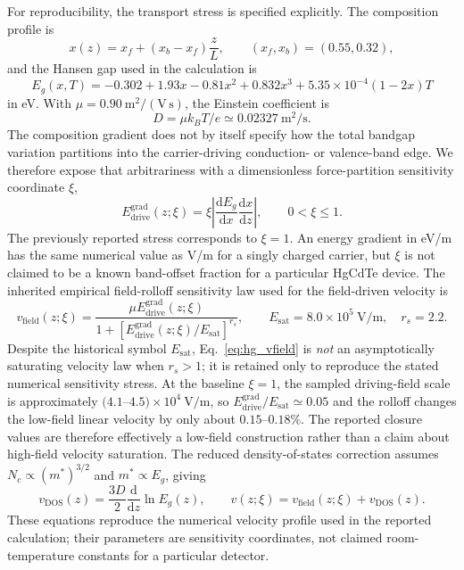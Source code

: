 \documentclass[11pt]{article}
\newcommand{\dd}{\mathrm{d}}
\begin{document}
For reproducibility, the transport stress is specified explicitly. The composition profile is
\begin{equation}
x(z)=x_f+(x_b-x_f)\frac{z}{L},\qquad (x_f,x_b)=(0.55,0.32),
\end{equation}
and the Hansen gap used in the calculation is
\begin{equation}
\boxed{E_g(x,T)=-0.302+1.93x-0.81x^2+0.832x^3+5.35\times10^{-4}(1-2x)T}
\label{eq:hansen_explicit}
\end{equation}
in eV. With $\mu=0.90~\mathrm{m^2/(V\,s)}$, the Einstein coefficient is
\begin{equation}
D=\mu k_BT/e\simeq0.02327~\mathrm{m^2/s}.
\end{equation}
The composition gradient does not by itself specify how the total bandgap variation partitions into the carrier-driving conduction- or valence-band edge.  We therefore expose that arbitrariness with a dimensionless force-partition sensitivity coordinate $\xi$,
\begin{equation}
\boxed{E_{\mathrm{drive}}^{\mathrm{grad}}(z;\xi)=\xi\left|\frac{\dd E_g}{\dd x}\frac{\dd x}{\dd z}\right|,\qquad 0<\xi\le1.}
\label{eq:hg_xi_field}
\end{equation}
The previously reported stress corresponds to $\xi=1$.  An energy gradient in eV/m has the same numerical value as V/m for a singly charged carrier, but $\xi$ is not claimed to be a known band-offset fraction for a particular HgCdTe device. The inherited empirical field-rolloff sensitivity law used for the field-driven velocity is
\begin{equation}
v_{\mathrm{field}}(z;\xi)=\frac{\mu E_{\mathrm{drive}}^{\mathrm{grad}}(z;\xi)}{1+[E_{\mathrm{drive}}^{\mathrm{grad}}(z;\xi)/E_{\mathrm{sat}}]^{r_s}},
\qquad E_{\mathrm{sat}}=8.0\times10^5~\mathrm{V/m},\quad r_s=2.2.
\label{eq:hg_vfield}
\end{equation}
Despite the historical symbol $E_{\mathrm{sat}}$, Eq.~\eqref{eq:hg_vfield} is \emph{not} an asymptotically saturating velocity law when $r_s>1$; it is retained only to reproduce the stated numerical sensitivity stress. At the baseline $\xi=1$, the sampled driving-field scale is approximately $(4.1$--$4.5)\times10^4~\mathrm{V/m}$, so $E_{\mathrm{drive}}^{\mathrm{grad}}/E_{\mathrm{sat}}\simeq0.05$ and the rolloff changes the low-field linear velocity by only about $0.15$--$0.18\%$. The reported closure values are therefore effectively a low-field construction rather than a claim about high-field velocity saturation. The reduced density-of-states correction assumes $N_c\propto(m^*)^{3/2}$ and $m^*\propto E_g$, giving
\begin{equation}
\boxed{v_{\mathrm{DOS}}(z)=\frac{3D}{2}\frac{\dd}{\dd z}\ln E_g(z),\qquad v(z;\xi)=v_{\mathrm{field}}(z;\xi)+v_{\mathrm{DOS}}(z).}
\label{eq:hg_velocity}
\end{equation}
These equations reproduce the numerical velocity profile used in the reported calculation; their parameters are sensitivity coordinates, not claimed room-temperature constants for a particular detector.
\end{document}
